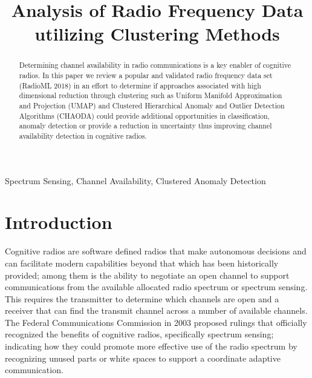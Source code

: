 \documentclass[conference]{IEEEtran}
\begin{document}
\pagestyle{plain}
\title{Analysis of Radio Frequency Data utilizing Clustering Methods\\
}
\author{
}
\maketitle

\begin{abstract}
Determining channel availability in radio communications is a key enabler of cognitive radios. In this paper we review a popular and validated radio frequency data set (RadioML 2018) in an effort to determine if approaches associated with high dimensional reduction through clustering such as Uniform Manifold Approximation and Projection (UMAP) and Clustered Hierarchical Anomaly and Outlier Detection Algorithms (CHAODA) could provide additional opportunities in classification, anomaly detection or provide a reduction in uncertainty thus improving channel availability detection in cognitive radios. 
\end{abstract}

\begin{IEEEkeywords}
Spectrum Sensing, Channel Availability, Clustered Anomaly Detection
\end{IEEEkeywords}

\section{Introduction}
Cognitive radios are software defined radios that make autonomous decisions and can facilitate modern capabilities beyond that which has been historically provided; among them is the ability to negotiate an open channel to support communications from the available allocated radio spectrum or spectrum sensing.  This requires the transmitter to determine which channels are open and a receiver that can find the transmit channel across a number of available channels. The Federal Communications Commission in 2003 \cite{b1} proposed rulings that officially recognized the benefits of cognitive radios, specifically spectrum sensing; indicating how they could promote more effective use of the radio spectrum by recognizing unused parts or white spaces to support a coordinate adaptive communication. 
 
\end{document}
